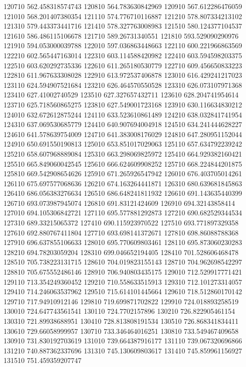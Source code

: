 {120710 562.458318574743
120810 564.783630842969
120910 567.612286476059
121010 568.201407380354
121110 574.776710116887
121210 578.807334213102
121310 579.443373441716
121410 578.327763008983
121510 580.124377104537
121610 586.486115106678
121710 589.26731340551
121810 593.529090290976
121910 594.053000039788
122010 597.036863448663
122110 600.221966863569
122210 602.565447163014
122310 603.114588420982
122410 603.594598203375
122510 603.620292735336
122610 611.265180530779
122710 609.456650833223
122810 611.967633308028
122910 613.972537406878
123010 616.429241217023
123110 624.594907521684
123210 626.464570550528
123310 626.073107971368
123410 627.41002740529
123510 627.327657432711
123610 628.204741954614
123710 625.718560865275
123810 627.549001723168
123910 630.116634830212
124010 632.672612875244
124110 633.523610861489
124210 638.032841741954
124310 637.069530685779
124410 640.907694004918
124510 634.241444628227
124610 641.578639754009
124710 641.383008176029
124810 647.280951152044
124910 650.691550190813
125010 653.851017029063
125110 657.634792239242
125210 658.607968889084
125310 663.298069825972
125410 664.929382160421
125510 665.849060042545
125610 666.624609908252
125710 668.224844201875
125810 669.542908654626
125910 671.265926547942
126010 676.403705014261
126110 675.697577068636
126210 674.163264441871
126310 680.639681845863
126410 686.056383276634
126510 686.648241811932
126610 691.143635440399
126710 693.073987945074
126810 691.83121424609
126910 694.32143858414
127010 694.105306842721
127110 695.577881292873
127210 690.682529344534
127310 689.33215065372
127410 690.115923970522
127510 693.771897329358
127610 692.880767411804
127710 693.698141372671
127810 698.86088788368
127910 696.637855106633
128010 695.770609803461
128110 695.873060230283
128210 694.78203059204
128310 699.046652194405
128410 701.528606468478
128510 705.738223131715
128610 704.019823155143
128710 704.962698542297
128810 705.675552486146
128910 706.940803435175
129010 712.529917771421
129110 713.354249360452
129210 710.558633515913
129310 712.101273314057
129410 714.246063537962
129510 715.614101445664
129610 718.512860170142
129710 717.94910912146
129810 719.699871702822
129910 724.018893258519
130010 724.647743561541
130110 724.7702157896
130210 726.822905461154
130310 721.89938688951
130410 728.813808191534
130510 726.868341834411
130610 729.66058999957
130710 733.346464016251
130810 733.549467409658
130910 731.830192703619
131010 739.664387916177
131110 739.067320696866
131210 740.887362337696
131310 745.130609803617
131410 745.859961156927
131510 751.459359207747
}
